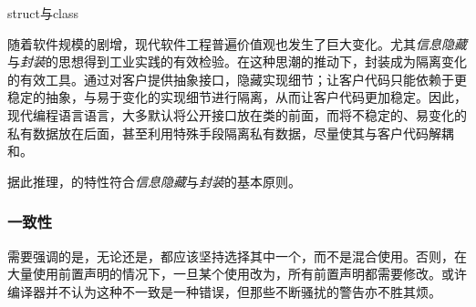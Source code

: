 \begin{content}
\begin{episode}{struct与class}
\begin{content}
随着软件规模的剧增，现代软件工程普遍价值观也发生了巨大变化。尤其\emph{信息隐藏}与\emph{封装}的思想得到工业实践的有效检验。在这种思潮的推动下，封装成为隔离变化的有效工具。通过对客户提供抽象接口，隐藏实现细节；让客户代码只能依赖于更稳定的抽象，与易于变化的实现细节进行隔离，从而让客户代码更加稳定。因此，现代编程语言语言，大多默认将公开接口放在类的前面，而将不稳定的、易变化的私有数据放在后面，甚至利用特殊手段隔离私有数据，尽量使其与客户代码解耦和。

据此推理，的特性符合\emph{信息隐藏}与\emph{封装}的基本原则。

\subsubsection{一致性}

需要强调的是，无论还是，都应该坚持选择其中一个，而不是混合使用。否则，在大量使用前置声明的情况下，一旦某个使用改为，所有前置声明都需要修改。或许编译器并不认为这种不一致是一种错误，但那些不断骚扰的警告亦不胜其烦。

\end{content}
\end{episode}

\end{content}
